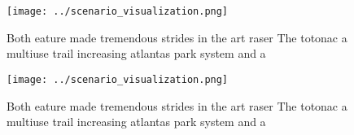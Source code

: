 \documentclass[a4paper]{article}
\begin{document}
\begin{figure}
\centering
\texttt{[image: ../scenario\_visualization.png]}
\caption{Both eature made tremendous strides in the art raser The totonac a multiuse trail increasing atlantas park system and a
}
\end{figure}
 
\begin{figure}
\centering
\texttt{[image: ../scenario\_visualization.png]}
\caption{Both eature made tremendous strides in the art raser The totonac a multiuse trail increasing atlantas park system and a
}
\end{figure}
 
\end{document}
